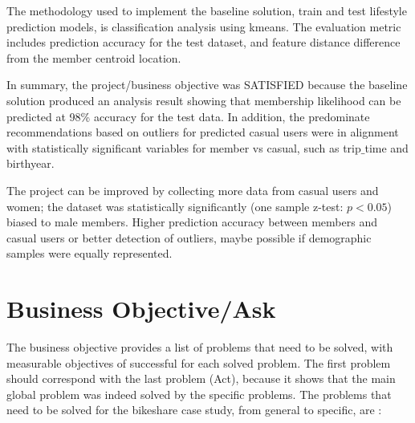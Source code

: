 \documentclass[11pt, onecolumn]{article}
\begin{document}
The methodology used to implement the baseline solution, train and test lifestyle prediction models, is classification analysis using kmeans. The evaluation metric includes prediction accuracy for the test dataset, and feature distance difference from the member centroid location.

In summary, the project/business objective was SATISFIED because the baseline solution produced an analysis result showing that membership likelihood can be predicted at 98\% accuracy for the test data. In addition, the predominate recommendations based on outliers for predicted casual users were in alignment with statistically significant variables for member vs casual, such as trip$\_$time and birthyear.  

The project can be improved by collecting more data from casual users and women; the dataset was statistically significantly (one sample z-test: $p < 0.05$) biased to male members. Higher prediction accuracy between members and casual users or better detection of outliers, maybe possible if demographic samples were equally represented.

\section{Business Objective/Ask}

The business objective provides a list of problems that need to be solved, with measurable objectives of successful for each solved problem. The first problem should correspond with the last problem (Act), because it shows that the main global problem was indeed solved by the specific problems. The problems that need to be solved for the bikeshare case study, from general to specific, are : 
\end{document}
